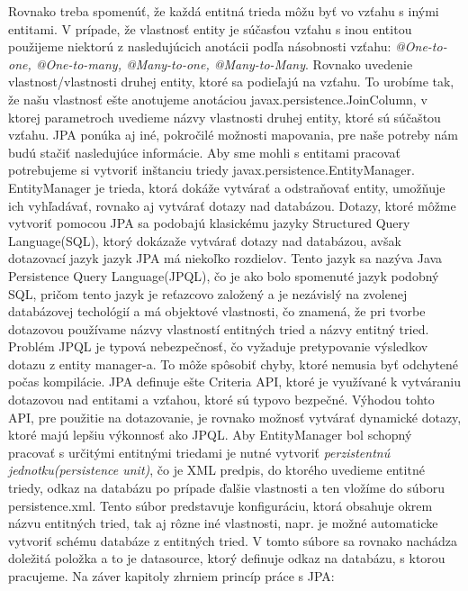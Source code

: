 Rovnako treba spomenúť, že každá entitná trieda môžu byť vo vzťahu s inými entitami. V prípade, že vlastnosť entity je súčasťou vzťahu s inou entitou použijeme niektorú z nasledujúcich anotácii podľa násobnosti vzťahu: \emph{@One-to-one, @One-to-many, @Many-to-one, @Many-to-Many}. Rovnako uvedenie vlastnost/vlastnosti druhej entity, ktoré sa podieľajú na vzťahu. To urobíme tak, že našu vlastnosť ešte anotujeme anotáciou javax.persistence.JoinColumn, v ktorej parametroch uvedieme názvy vlastnosti druhej entity, ktoré sú súčaštou vzťahu.
JPA ponúka aj iné, pokročilé možnosti mapovania, pre naše potreby nám budú stačiť nasledujúce informácie.
\newline \indent Aby sme mohli s entitami pracovať potrebujeme si vytvoriť inštanciu triedy javax.persistence.EntityManager. EntityManager je trieda, ktorá dokáže vytvárať a odstraňovať entity, umožňuje ich vyhľadávať, rovnako aj vytvárať dotazy nad databázou. Dotazy, ktoré môžme vytvoriť pomocou JPA sa podobajú klasickému jazyky Structured Query Language(SQL), ktorý dokázaže vytvárať dotazy nad databázou, avšak dotazovací jazyk jazyk JPA má niekoľko rozdielov. Tento jazyk sa nazýva Java Persistence Query Language(JPQL), čo je ako bolo spomenuté jazyk podobný SQL, pričom tento jazyk je reťazcovo založený a je nezávislý na zvolenej databázovej techológií a má objektové vlastnosti, čo znamená, že pri tvorbe dotazovou používame názvy vlastností entitných tried a názvy entitný tried. Problém JPQL je typová nebezpečnosť, čo vyžaduje pretypovanie výsledkov dotazu z entity manager-a. To môže spôsobiť chyby, ktoré nemusia byť odchytené počas kompilácie. JPA definuje ešte Criteria API, ktoré je využívané k vytváraniu dotazovou nad entitami a vzťahou, ktoré sú typovo bezpečné. Výhodou tohto API, pre použitie na dotazovanie, je rovnako možnosť vytvárať dynamické dotazy, ktoré majú lepšiu výkonnosť ako JPQL. Aby EntityManager bol schopný pracovať s určitými entitnými triedami je nutné vytvoriť \emph{perzistentnú jednotku(persistence unit)}, čo je XML predpis, do ktorého uvedieme entitné triedy, odkaz na databázu po prípade ďalšie vlastnosti a ten vložíme do súboru persistence.xml. Tento súbor predstavuje konfiguráciu, ktorá obsahuje okrem názvu entitných tried, tak aj rôzne iné vlastnosti, napr. je možné automaticke vytvoriť schému databáze z entitných tried. V tomto súbore sa rovnako nachádza doležitá položka a to je datasource, ktorý definuje odkaz na databázu, s ktorou pracujeme. Na záver kapitoly zhrniem princíp práce s JPA:
